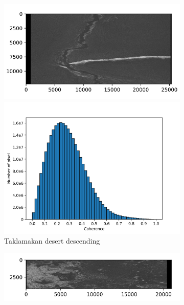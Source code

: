 \documentclass[a4paper,fleqn]{cas-sc}
\begin{document}
\begin{figure}
\begin{subfigure}[c]{0.5\textwidth}
\begin{minipage}[c]{0.5\textwidth}
            \centering
            \includegraphics[width=\textwidth]{figure/The coherence/coh_TaklimakanDesert_des_esd1.png}
        \end{minipage}%
        \begin{minipage}[c]{0.5\textwidth}
            \centering
            \includegraphics[width=\textwidth]{figure/The coherence/coh_TaklimakanDesert_des_esd1_histogram_.png}
        \end{minipage}
        \caption{Taklamakan desert descending}
        \label{fig_6b}
    \end{subfigure}%
    \hfill
    \begin{subfigure}{0.5\textwidth}
        \centering
        \begin{minipage}{0.5\textwidth}
            \centering
            \includegraphics[width=\textwidth]{figure/The coherence/coh_Mexico_asc_esd1.png}

\end{minipage}
\end{subfigure}
\end{figure}
\end{document}
